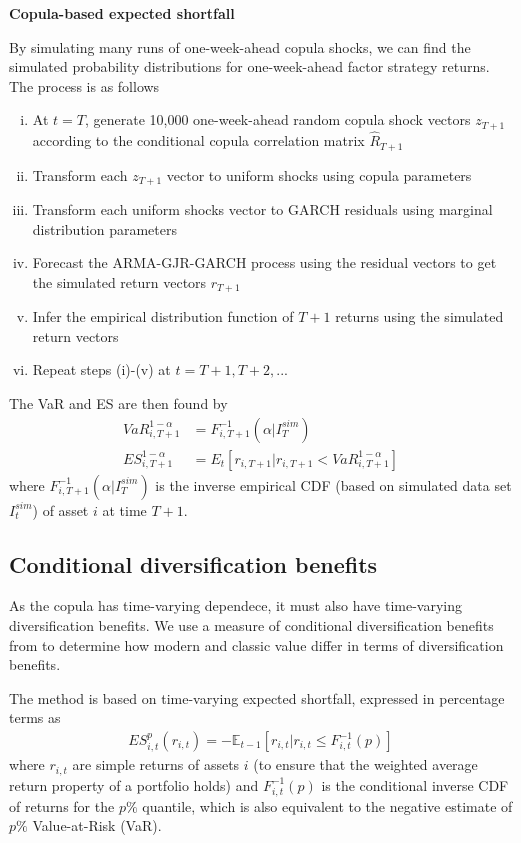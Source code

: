 \textbf{Copula-based expected shortfall}

By simulating many runs of one-week-ahead copula shocks, we can find the simulated probability distributions for one-week-ahead factor strategy returns. The process is as follows
\begin{enumerate}[(i)]
    \item At $t = T$, generate 10,000 one-week-ahead random copula shock vectors $z_{T+1}$ according to the conditional copula correlation matrix $\hat{R}_{T+1}$
    \item Transform each $z_{T+1}$ vector to uniform shocks using copula parameters
    \item Transform each uniform shocks vector to GARCH residuals using marginal distribution parameters
    \item Forecast the ARMA-GJR-GARCH process using the residual vectors to get the simulated return vectors $r_{T+1}$
    \item Infer the empirical distribution function of $T+1$ returns using the simulated return vectors
    \item Repeat steps (i)-(v) at $t = T+1, T+2, ...$
\end{enumerate}
The VaR and ES are then found by
\begin{align}
    VaR_{i,T+1}^{1-\alpha} &= F_{i, T+1}^{-1}(\alpha | I^{sim}_T) \\
    ES_{i, T+1}^{1 - \alpha} &= E_t[r_{i,T+1} | r_{i,T+1} < VaR_{i,T+1}^{1-\alpha}]
\end{align}
where $F_{i, T+1}^{-1}(\alpha | I^{sim}_T)$ is the inverse empirical CDF (based on simulated data set $I^{sim}_t$) of asset $i$ at time $T+1$.

\subsection{Conditional diversification benefits}
As the copula has time-varying dependece, it must also have time-varying diversification benefits. We use a measure of conditional diversification benefits from \textcite{ChristoffersenErrunzaJacobLanglois2012} to determine how modern and classic value differ in terms of diversification benefits. 

The method is based on time-varying expected shortfall, expressed in percentage terms as
\begin{align}
    ES^p_{i,t}(r_{i,t}) = -\mathbb{E}_{t-1}[r_{i,t} | r_{i,t} \leq F_{i,t}^{-1}(p)]
\end{align}
where $r_{i,t}$ are simple returns of assets $i$ (to ensure that the weighted average return property of a portfolio holds) and $F_{i,t}^{-1}(p)$ is the conditional inverse CDF of returns for the $p\%$ quantile, which is also equivalent to the negative estimate of $p\%$ Value-at-Risk (VaR).

